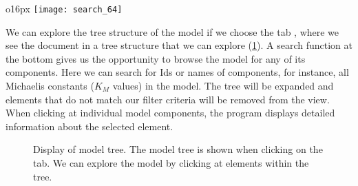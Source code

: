\begin{wrapfigure}{o}{16px}
\texttt{[image: search\_64]}%
\end{wrapfigure}
We can explore the tree structure of the model if we choose the tab , where we see the \SBML document in a tree structure that we can explore (\cref{fig:modelTree}).
A search function at the bottom gives us the opportunity to browse the model for any of its components.
Here we can search for \acp{Id} or names of components, for instance, all Michaelis constants ($K_M$ values) in the model.
The tree will be expanded and elements that do not match our filter criteria will be removed from the view.
When clicking at individual model components, the program displays detailed information about the selected element.
\begin{figure}[t]
\centering
{}
\caption[Display of model tree]{Display of model tree.
The model tree is shown when clicking on the  tab.
We can explore the model by clicking at elements within the tree.}
\label{fig:modelTree}
\end{figure}


